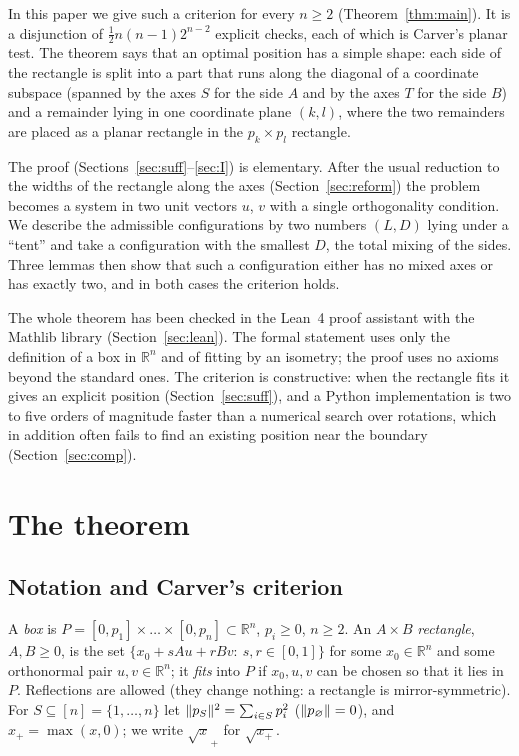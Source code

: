 \documentclass[11pt]{article}
\theoremstyle{definition}
\theoremstyle{remark}
\newcommand{\R}{\mathbb{R}}
\DeclarePairedDelimiter{\norm}{\lVert}{\rVert}
\begin{document}
In this paper we give such a criterion for every $n\ge2$ (Theorem~\ref{thm:main}). It is a disjunction of
$\tfrac12 n(n-1)2^{n-2}$ explicit checks, each of which is Carver's planar test. The theorem says that
an optimal position has a simple shape: each side of the rectangle is split into a part that runs
along the diagonal of a coordinate subspace (spanned by the axes $S$ for the side $A$ and by the
axes $T$ for the side $B$) and a remainder lying in one coordinate plane $(k,l)$, where the two
remainders are placed as a planar rectangle in the $p_k\times p_l$ rectangle.

The proof (Sections~\ref{sec:suff}--\ref{sec:I}) is elementary. After the usual reduction to the widths
of the rectangle along the axes (Section~\ref{sec:reform}) the problem becomes a system in two unit
vectors $u$, $v$ with a single orthogonality condition. We describe the admissible configurations by
two numbers $(L,D)$ lying under a ``tent'' and take a configuration with the smallest $D$, the total
mixing of the sides. Three lemmas then show that such a configuration either has no mixed axes or has
exactly two, and in both cases the criterion holds.

The whole theorem has been checked in the Lean~4 proof assistant with the Mathlib library
(Section~\ref{sec:lean}). The formal statement uses only the definition of a box in $\R^n$ and of fitting
by an isometry; the proof uses no axioms beyond the standard ones. The criterion is constructive: when
the rectangle fits it gives an explicit position (Section~\ref{sec:suff}), and a Python implementation is
two to five orders of magnitude faster than a numerical search over rotations, which in addition
often fails to find an existing position near the boundary (Section~\ref{sec:comp}).

\section{The theorem}\label{sec:thm}

\subsection{Notation and Carver's criterion}

A \emph{box} is $P=[0,p_1]\times\dots\times[0,p_n]\subset\R^n$, $p_i\ge0$, $n\ge2$. An $A\times B$
\emph{rectangle}, $A,B\ge0$, is the set $\{x_0+sAu+rBv:\ s,r\in[0,1]\}$ for some $x_0\in\R^n$ and some
orthonormal pair $u,v\in\R^n$; it \emph{fits} into $P$ if $x_0,u,v$ can be chosen so that it lies in $P$.
Reflections are allowed (they change nothing: a rectangle is mirror-symmetric). For $S\subseteq[n]=\{1,\dots,n\}$
let $\norm{p_S}^2=\sum_{i\in S}p_i^2$ ($\norm{p_\varnothing}=0$), and $x_+=\max(x,0)$; we write
$\sqrt{x}_+$ for $\sqrt{x_+}$.
\end{document}
